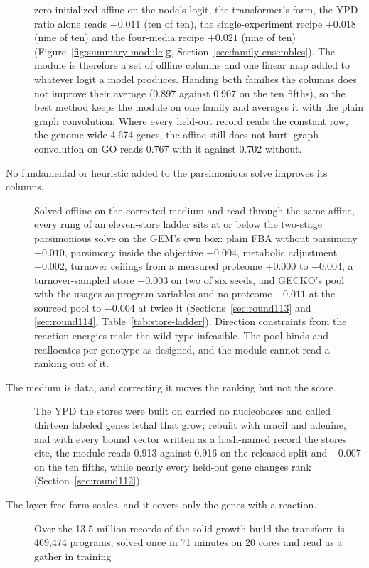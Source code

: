 \begin{description}
    zero-initialized affine on the node's logit, the transformer's form, the YPD ratio
    alone reads $+0.011$ (ten of ten), the single-experiment recipe $+0.018$ (nine of
    ten) and the four-media recipe $+0.021$ (nine of ten)
    (Figure~\ref{fig:summary-module}\textbf{g}, Section~\ref{sec:family-ensembles}). The
    module is therefore a set of offline columns and one linear map added to whatever
    logit a model produces. Handing both families the columns does not improve their
    average (0.897 against 0.907 on the ten fifths), so the best method keeps the
    module on one family and averages it with the plain graph convolution. Where every
    held-out record reads the constant row, the genome-wide 4,674 genes, the affine still
    does not hurt: graph convolution on GO reads 0.767 with it against 0.702 without.
  \item[No fundamental or heuristic added to the parsimonious solve improves its
    columns.] Solved offline on the corrected medium and read through the same affine,
    every rung of an eleven-store ladder sits at or below the two-stage parsimonious
    solve on the GEM's own box: plain FBA without parsimony $-0.010$, parsimony inside
    the objective $-0.004$, metabolic adjustment $-0.002$, turnover ceilings from a
    measured proteome $+0.000$ to $-0.004$, a turnover-sampled store $+0.003$ on two of
    six seeds, and GECKO's pool with the usages as program variables and no proteome
    $-0.011$ at the sourced pool to $-0.004$ at twice it (Sections~\ref{sec:round113}
    and \ref{sec:round114}, Table~\ref{tab:store-ladder}). Direction constraints from
    the reaction energies make the wild type infeasible. The pool binds and reallocates
    per genotype as designed, and the module cannot read a ranking out of it.
  \item[The medium is data, and correcting it moves the ranking but not the score.] The
    YPD the stores were built on carried no nucleobases and called thirteen labeled
    genes lethal that grow; rebuilt with uracil and adenine, and with every bound vector
    written as a hash-named record the stores cite, the module reads 0.913 against
    0.916 on the released split and $-0.007$ on the ten fifths, while nearly every
    held-out gene changes rank (Section~\ref{sec:round112}).
  \item[The layer-free form scales, and it covers only the genes with a reaction.] Over
    the 13.5 million records of the solid-growth build the transform is 469,474
    programs, solved once in 71 minutes on 20 cores and read as a gather in training

\end{description}
